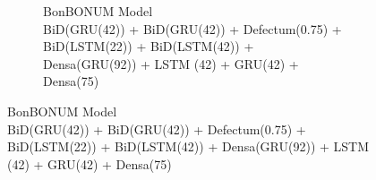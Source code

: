 \documentclass[preprint,3p,times,twocolumn]{elsarticle}  %
\begin{document}
\iffigninewide
\begin{figure}%
\else
\begin{figure}%
\fi
%
\centering
{}
%
\caption{BonBONUM Model\\\scriptsize BiD(GRU(42)) + BiD(GRU(42)) + Defectum(0.75)  +  BiD(LSTM(22)) + BiD(LSTM(42)) + Densa(GRU(92)) + LSTM (42) + GRU(42) + Densa(75)
}\label{fig:9}
\iffigninewide
\end{figure}
\else
\end{figure}
\fi
\end{document}
